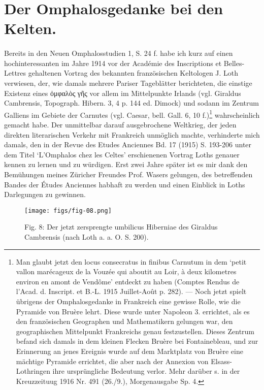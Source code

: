 \documentclass[a4paper, 11pt, oneside]{article}
\begin{document}
\section{Der Omphalosgedanke bei den Kelten.}
\paragraph{}
Bereits in den Neuen Omphalosstudien 1, S. 24 f. habe ich kurz auf einen hochinteressanten im Jahre 1914 vor der Académie des Inscriptions et Belles-Lettres gehaltenen Vortrag des bekannten französischen Keltologen J. Loth verwiesen, der, wie damals mehrere Pariser Tageblätter berichteten, die einstige Existenz eines ὀμφαλὸς γῆς vor allem im Mittelpunkte Irlands (vgl. Giraldus Cambrensis, Topograph. Hibern. 3, 4 p. 144 ed. Dimock) und sodann im Zentrum Galliens im Gebiete der Carnutes (vgl. Caesar, bell. Gall. 6, 10 f.)\footnote{Man glaubt jetzt den locus consecratus in finibus Carnutum in dem `petit vallon marécageux de la Vouzée qui aboutit au Loir, à deux kilometres environ en amont de Vendôme' entdeckt zu haben (Comptes Rendus de l'Acad. d. Inscript. et B.-L. 1915 Juillet-Août p. 282). --- Noch jetzt spielt übrigens der Omphalosgedanke in Frankreich eine gewisse Rolle, wie die Pyramide von Bruère lehrt. Diese wurde unter Napoleon 3. errichtet, als es den französischen Geographen und Mathematikern gelungen war, den geographischen Mittelpunkt Frankreichs genau festzustellen. Dieses Zentrum befand sich damals in dem kleinen Flecken Bruère bei Fontainebleau, und zur Erinnerung an jenes Ereignis wurde auf dem Marktplatz von Bruère eine mächtige Pyramide errichtet, die aber nach der Annexion von Elsass-Lothringen ihre ursprüngliche Bedeutung verlor. Mehr darüber s. in der Kreuzzeituug 1916 Nr. 491 (26./9.), Morgenausgabe Sp. 4.} wahrscheinlich gemacht habe. Der unmittelbar darauf ausgebrochene Weltkrieg, der jeden direkten literarischen Verkehr mit Frankreich unmöglich machte, verhinderte mich damals, den in der Revue des Etudes Anciennes Bd. 17 (1915) S. 193-206 unter dem Titel `L'Omphalos chez les Celtes' erschienenen Vortrag Loths genauer kennen zu lernen und zu würdigen. Erst zwei Jahre später ist es mir dank den Bemühungen meines Züricher Freundes Prof. Wasers gelungen, des betreffenden Bandes der Études Anciennes habhaft zu werden und einen Einblick in Loths Darlegungen zu gewinnen.

\begin{figure}[H]
\centering
\texttt{[image: figs/fig-08.png]}
\caption{Fig. 8: Der jetzt zersprengte umbilicus Hiberniae des Giraldus Cambrensis (nach Loth a. a. O. S. 200).}
\end{figure}
\end{document}
